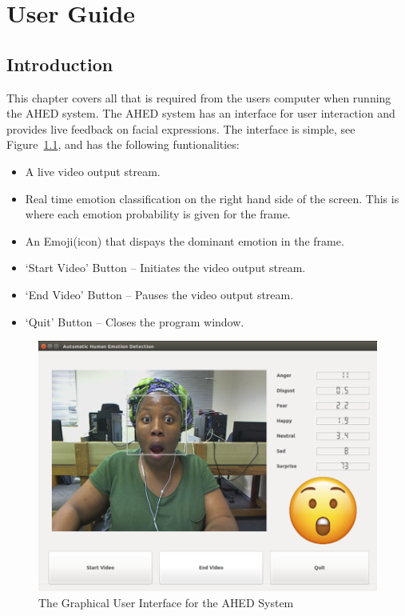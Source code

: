 \chapter{User Guide} %
%


\section{Introduction} %
This chapter covers all that is required from the users computer when running the AHED system. The AHED system has an interface for user interaction and provides live feedback on facial expressions. The interface is simple, see Figure~\ref{fig:gui}, and has the following funtionalities:
\begin{itemize}
\item A live video output stream. 
\item Real time emotion classification on the right hand side of the screen. This is where each emotion probability is given for the frame.
\item An Emoji(icon) that dispays the dominant emotion in the frame.
\item `Start Video' Button -- Initiates the video output stream.
\item `End Video' Button -- Pauses the video output stream.
\item `Quit' Button -- Closes the program window.
\end{itemize}
\begin{figure}[H]
  \centering
  \includegraphics[scale= 0.8]{gui}
  \caption{The Graphical User Interface for the AHED System}
  \label{fig:gui}
\end{figure} 


